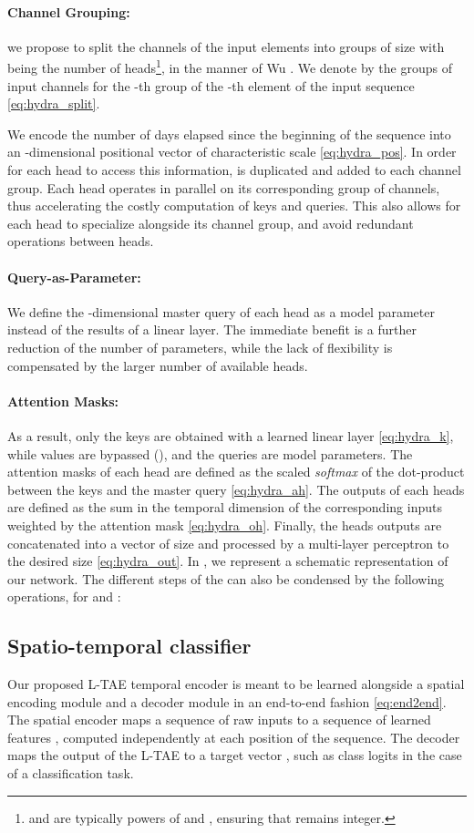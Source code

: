 \documentclass[runningheads]{llncs}
\begin{document}
\paragraph{Channel Grouping:} we propose to split the  channels of the input elements into  groups of size  with  being the number of heads\footnote{ and  are typically powers of  and , ensuring that  remains integer.}, in the manner of Wu \etal \cite{wu2018group}. We denote by  the groups of input channels for the -th group of the -th element of the input sequence \eqref{eq:hydra_split}.

We encode the number of days elapsed since the beginning of the sequence into an -dimensional positional vector  of characteristic scale  \eqref{eq:hydra_pos}. In order for each head to access this information,  is duplicated and added to each channel group.
Each head operates in parallel on its corresponding group of channels, thus accelerating the costly computation of keys and queries. This also allows for each head to specialize alongside its channel group, and avoid redundant operations between heads.
\paragraph{Query-as-Parameter:}
We define the -dimensional master query  of each head  as a model parameter instead of the results of a linear layer. The immediate benefit is a further reduction of the number of parameters, while the lack of flexibility is compensated by the larger number of available heads.
\paragraph{Attention Masks:}
As a result, only the keys are obtained with a learned linear layer \eqref{eq:hydra_k}, while values are bypassed (), and the queries are model parameters. The attention masks  of each head  are defined as the scaled \emph{softmax} of the dot-product between the keys and the master query \eqref{eq:hydra_ah}.
The outputs  of each heads are defined as the sum in the temporal dimension of the corresponding inputs weighted by the attention mask  \eqref{eq:hydra_oh}. Finally, the heads outputs are concatenated into a vector of size  and processed by a multi-layer perceptron  to the desired size \eqref{eq:hydra_out}.
In , we represent a schematic representation of our network. The different steps of the   can also be condensed by the following operations, for  and :

\subsection{Spatio-temporal classifier}
Our proposed L-TAE temporal encoder is meant to be learned alongside a spatial encoding module and a decoder module in an end-to-end fashion \eqref{eq:end2end}.
The spatial encoder  maps a sequence of raw inputs  to a sequence of learned features , computed independently at each position of the sequence.
The decoder  maps the output  of the L-TAE to a target vector , such as class logits in the case of a classification task.
\end{document}
